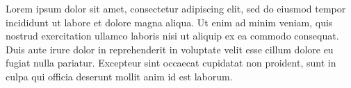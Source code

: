Lorem ipsum dolor sit amet, consectetur adipiscing elit, sed do eiusmod tempor incididunt ut labore et dolore magna aliqua. Ut enim ad minim veniam, quis nostrud exercitation ullamco laboris nisi ut aliquip ex ea commodo consequat. Duis aute irure dolor in reprehenderit in voluptate velit esse cillum dolore eu fugiat nulla pariatur. Excepteur sint occaecat cupidatat non proident, sunt in culpa qui officia deserunt mollit anim id est laborum.

\newpage